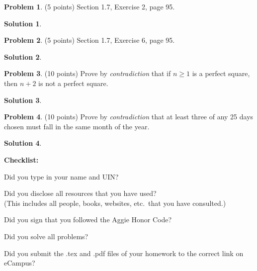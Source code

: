 \documentclass{article}
\theoremstyle{definition}
\newtheorem{problem}{Problem}
\newtheorem*{solution}{Solution}
\newcommand{\checklist}{\noindent\textbf{Checklist:}
\begin{compactitem}[$\Box$] 
\item Did you type in your name and UIN? 
\item Did you disclose all resources that you have used? \\
(This includes all people, books, websites, etc.\ that you have consulted.)
\item Did you sign that you followed the Aggie Honor Code? 
\item Did you solve all problems? 
\item Did you submit  the .tex and .pdf files of your homework to the correct link on eCampus? 
\end{compactitem}
}
\begin{document}
\begin{problem} (5 points) Section 1.7, Exercise 2, page 95. 
\end{problem}
\begin{solution}
\end{solution}

\begin{problem} (5 points) Section 1.7, Exercise 6, page 95.  
\end{problem}
\begin{solution}
\end{solution}

\begin{problem} (10 points) Prove by \textit{contradiction} that 
if $n\ge 1$ is a perfect square, then $n+2$ is not a perfect square. 
\end{problem}
\begin{solution}
\end{solution}

\begin{problem} (10 points) Prove by \textit{contradiction} that
at least three of any 25 days chosen must fall in the same month 
of the year.
\end{problem}
\begin{solution}
\end{solution} 

\goodbreak
\checklist
\end{document}
